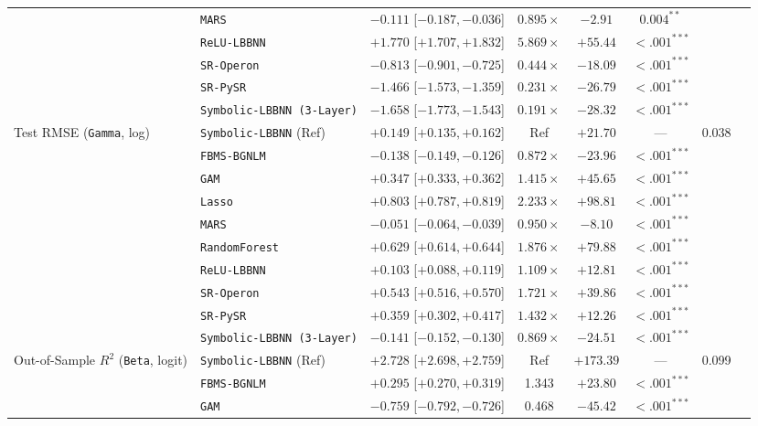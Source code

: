 \begin{table}[htbp]
{{\begin{tabular}{llcccccc}
 & \texttt{MARS} & $-0.111$ [$-0.187, -0.036$] & $0.895\times$ & $-2.91$ & $0.004^{**}$ &  \\
 & \texttt{ReLU-LBBNN} & $+1.770$ [$+1.707, +1.832$] & $5.869\times$ & $+55.44$ & $<.001^{***}$ &  \\
 & \texttt{SR-Operon} & $-0.813$ [$-0.901, -0.725$] & $0.444\times$ & $-18.09$ & $<.001^{***}$ &  \\
 & \texttt{SR-PySR} & $-1.466$ [$-1.573, -1.359$] & $0.231\times$ & $-26.79$ & $<.001^{***}$ &  \\
 & \texttt{Symbolic-LBBNN (3-Layer)} & $-1.658$ [$-1.773, -1.543$] & $0.191\times$ & $-28.32$ & $<.001^{***}$ &  \\
\midrule
Test RMSE (\texttt{Gamma}, log) & \texttt{Symbolic-LBBNN} (Ref) & $+0.149$ [$+0.135, +0.162$] & Ref & $+21.70$ & --- & 0.038 \\
 & \texttt{FBMS-BGNLM} & $-0.138$ [$-0.149, -0.126$] & $0.872\times$ & $-23.96$ & $<.001^{***}$ &  \\
 & \texttt{GAM} & $+0.347$ [$+0.333, +0.362$] & $1.415\times$ & $+45.65$ & $<.001^{***}$ &  \\
 & \texttt{Lasso} & $+0.803$ [$+0.787, +0.819$] & $2.233\times$ & $+98.81$ & $<.001^{***}$ &  \\
 & \texttt{MARS} & $-0.051$ [$-0.064, -0.039$] & $0.950\times$ & $-8.10$ & $<.001^{***}$ &  \\
 & \texttt{RandomForest} & $+0.629$ [$+0.614, +0.644$] & $1.876\times$ & $+79.88$ & $<.001^{***}$ &  \\
 & \texttt{ReLU-LBBNN} & $+0.103$ [$+0.088, +0.119$] & $1.109\times$ & $+12.81$ & $<.001^{***}$ &  \\
 & \texttt{SR-Operon} & $+0.543$ [$+0.516, +0.570$] & $1.721\times$ & $+39.86$ & $<.001^{***}$ &  \\
 & \texttt{SR-PySR} & $+0.359$ [$+0.302, +0.417$] & $1.432\times$ & $+12.26$ & $<.001^{***}$ &  \\
 & \texttt{Symbolic-LBBNN (3-Layer)} & $-0.141$ [$-0.152, -0.130$] & $0.869\times$ & $-24.51$ & $<.001^{***}$ &  \\
\midrule
Out-of-Sample $R^2$ (\texttt{Beta}, logit) & \texttt{Symbolic-LBBNN} (Ref) & $+2.728$ [$+2.698, +2.759$] & Ref & $+173.39$ & --- & 0.099 \\
 & \texttt{FBMS-BGNLM} & $+0.295$ [$+0.270, +0.319$] & 1.343 & $+23.80$ & $<.001^{***}$ &  \\
 & \texttt{GAM} & $-0.759$ [$-0.792, -0.726$] & 0.468 & $-45.42$ & $<.001^{***}$ &  \\

\end{tabular}}}
\end{table}
